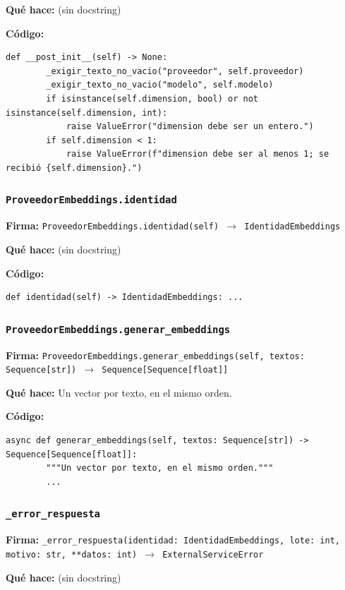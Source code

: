 \documentclass[11pt,a4paper]{article}
\begin{document}
\textbf{Qué hace:} (sin docstring)

\textbf{Código:}
\begin{lstlisting}
def __post_init__(self) -> None:
        _exigir_texto_no_vacio("proveedor", self.proveedor)
        _exigir_texto_no_vacio("modelo", self.modelo)
        if isinstance(self.dimension, bool) or not isinstance(self.dimension, int):
            raise ValueError("dimension debe ser un entero.")
        if self.dimension < 1:
            raise ValueError(f"dimension debe ser al menos 1; se recibió {self.dimension}.")
\end{lstlisting}

\subsubsection*{\texttt{ProveedorEmbeddings.identidad}}
\textbf{Firma:} \texttt{ProveedorEmbeddings.identidad(self) $\rightarrow$ IdentidadEmbeddings}

\textbf{Qué hace:} (sin docstring)

\textbf{Código:}
\begin{lstlisting}
def identidad(self) -> IdentidadEmbeddings: ...
\end{lstlisting}

\subsubsection*{\texttt{ProveedorEmbeddings.generar\_embeddings}}
\textbf{Firma:} \texttt{ProveedorEmbeddings.generar\_embeddings(self, textos: Sequence[str]) $\rightarrow$ Sequence[Sequence[float]]}

\textbf{Qué hace:} Un vector por texto, en el mismo orden.

\textbf{Código:}
\begin{lstlisting}
async def generar_embeddings(self, textos: Sequence[str]) -> Sequence[Sequence[float]]:
        """Un vector por texto, en el mismo orden."""
        ...
\end{lstlisting}

\subsubsection*{\texttt{\_error\_respuesta}}
\textbf{Firma:} \texttt{\_error\_respuesta(identidad: IdentidadEmbeddings, lote: int, motivo: str, **datos: int) $\rightarrow$ ExternalServiceError}

\textbf{Qué hace:} (sin docstring)
\end{document}

